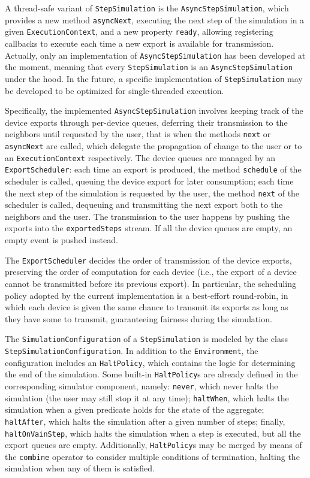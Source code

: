 A thread-safe variant of \texttt{StepSimulation} is the
\texttt{AsyncStepSimulation}, which provides a new method \texttt{asyncNext},
executing the next step of the simulation in a given \texttt{ExecutionContext},
and a new property \texttt{ready}, allowing registering callbacks to execute
each time a new export is available for transmission. Actually, only an
implementation of \texttt{AsyncStepSimulation} has been developed at the
moment, meaning that every \texttt{StepSimulation} is an
\texttt{AsyncStepSimulation} under the hood. In the future, a specific
implementation of \texttt{StepSimulation} may be developed to be optimized for
single-threaded execution.

Specifically, the implemented \texttt{AsyncStepSimulation} involves keeping
track of the device exports through per-device queues, deferring their
transmission to the neighbors until requested by the user, that is when the
methods \texttt{next} or \texttt{asyncNext} are called, which delegate the
propagation of change to the user or to an \texttt{ExecutionContext}
respectively. The device queues are managed by an \texttt{ExportScheduler}:
each time an export is produced, the method \texttt{schedule} of the scheduler
is called, queuing the device export for later consumption; each time the next
step of the simulation is requested by the user, the method \texttt{next} of
the scheduler is called, dequeuing and transmitting the next export both to the
neighbors and the user. The transmission to the user happens by pushing the
exports into the \texttt{exportedSteps} stream. If all the device queues are
empty, an empty event is pushed instead.

The \texttt{ExportScheduler} decides the order of transmission of the device
exports, preserving the order of computation for each device (i.e., the export
of a device cannot be transmitted before its previous export). In particular,
the scheduling policy adopted by the current implementation is a best-effort
round-robin, in which each device is given the same chance to transmit its
exports as long as they have some to transmit, guaranteeing fairness during the
simulation.

The \texttt{SimulationConfiguration} of a \texttt{StepSimulation} is modeled by
the class \texttt{StepSimulationConfiguration}. In addition to the
\texttt{Environment}, the configuration includes an \texttt{HaltPolicy}, which
contains the logic for determining the end of the simulation. Some built-in
\texttt{HaltPolicy}s are already defined in the corresponding simulator
component, namely: \texttt{never}, which never halts the simulation (the user
may still stop it at any time); \texttt{haltWhen}, which halts the simulation
when a given predicate holds for the state of the aggregate;
\texttt{halt\-After}, which halts the simulation after a given number of steps;
finally, \texttt{haltOnVainStep}, which halts the simulation when a step is
executed, but all the export queues are empty. Additionally,
\texttt{HaltPolicy}s may be merged by means of the \texttt{combine} operator to
consider multiple conditions of termination, halting the simulation when any of
them is satisfied.

